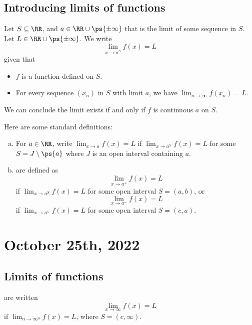 \documentclass[11pt]{scrartcl}
\numberwithin{equation}{section}
\begin{document}
\subsection{Introducing limits of functions}
\begin{definition}
    Let $S\subseteq \RR$, and $a\in \RR\cup\ps{\pm\infty}$ that 
    is the limit of some sequence in $S$. Let $L\in\RR\cup\ps{\pm\infty}$.
    We write 
    \[ \lim_{x\rightarrow a^S}f(x) = L\]
    given that
    \begin{itemize}
        \item $f$ is a function defined on $S$.
        \item For every sequence $(x_n)$ in $S$ with limit $a$, we 
        have $\lim_{n\rightarrow \infty}f(x_n) = L$.
    \end{itemize}
\end{definition}
We can conclude the limit exists if and only if $f$ is continuous $a$
on $S$. 
\begin{definition}
    Here are some standard definitions:
    \begin{enumerate}[a.]
        \item For $a\in\RR$, write $\lim_{x\rightarrow a}f(x)=L$ if 
        $\lim_{x\rightarrow a^S}f(x)=L$ for some $S=J\setminus\ps{a}$
        where $J$ is an open interval containing $a$.
        \item {} are defined as 
        \[\lim_{x\rightarrow a^+}f(x)=L \]
        if $\lim_{x\rightarrow a^S}f(x)=L$ for some open interval $S=(a,b)$,
        or 
        \[\lim_{x\rightarrow a^-}f(x) = L \]
        if $\lim_{x\rightarrow a^S}f(x)=L$ for some open interval $S=(c,a)$.
    \end{enumerate}
\end{definition}
\clearpage
\section{October 25th, 2022}
\subsection{Limits of functions}

\begin{definition}
     are written 
    \[ \lim_{x\rightarrow \infty}f(x) = L \]
    if $\lim_{n\rightarrow \infty^S}f(x)=L$, where $S=(c,\infty)$.
\end{definition}
\end{document}
